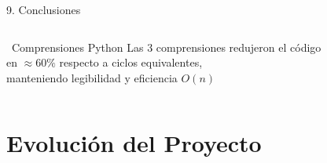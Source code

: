 \documentclass[11pt, aspectratio=169]{beamer}
\newcommand{\tick}{\textcolor{SmartGreen}{\ding{52}}}
\begin{document}
\begin{frame}{9. Conclusiones}
\begin{columns}[t]
\begin{alertblock}{\tick\ Comprensiones Python}
\footnotesize
Las 3 comprensiones redujeron el código\\
en $\approx60\%$ respecto a ciclos equivalentes,\\
manteniendo legibilidad y eficiencia $O(n)$
\end{alertblock}

\end{columns}
\end{frame}

\section{Evolución del Proyecto}
\end{document}
